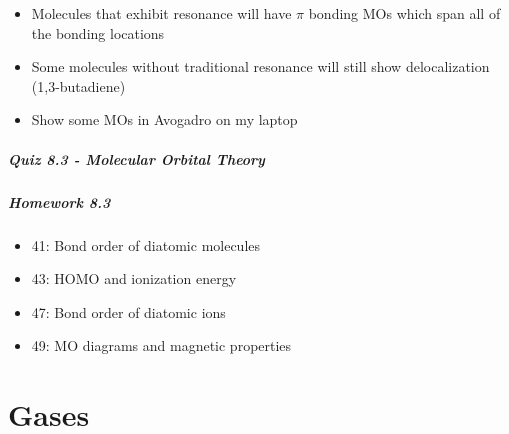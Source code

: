 \documentclass[12pt, openany, letterpaper]{memoir}
\begin{document}
\begin{itemize}
    \begin{itemize}
      \item \emph{All} materials are either attracted to or repelled by a magnetic field
      \item \emph{Diamagnetic} materials are repelled by a magnetic field, while \emph{paramagnetic} materials are attracted by a magnetic field. Ferromagnetism (regular old magnetism) is like a cooperative paramagnetic effect in some metals
      \item Diamagnetism comes from having all electrons paired. , , and  are diamagnetic
      \item Paramagnetism comes from at least one unpaired electron.  and  are paramagnetic
    \end{itemize}
	\item Molecules that exhibit resonance will have $\pi$ bonding MOs which span all of the bonding locations
	\item Some molecules without traditional resonance will still show delocalization (1,3-butadiene)
	\item Show some MOs in Avogadro on my laptop
\end{itemize}

\paragraph*{Quiz 8.3 - Molecular Orbital Theory}
\paragraph*{Homework 8.3}
\begin{itemize}
  \item 41: Bond order of diatomic molecules
  \item 43: HOMO and ionization energy
  \item 47: Bond order of diatomic ions
  \item 49: MO diagrams and magnetic properties
\end{itemize}

\chapter{Gases}
\end{document}
